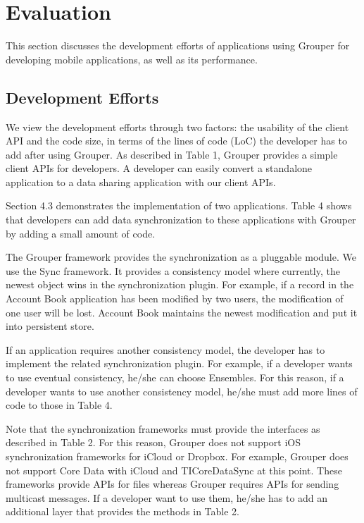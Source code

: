 \documentclass{sig-alternate-05-2015}
\begin{document}
\section{Evaluation}

This section discusses the development efforts of applications using Grouper for developing mobile applications, as well as its performance.

\subsection{Development Efforts}

We view the development efforts through two factors: the usability of the client API and the code size, in terms of the lines of code (LoC) the developer has to add after using Grouper. 
As described in Table 1, Grouper provides a simple client APIs for developers.
A developer can easily convert a standalone application to a data sharing application with our client APIs.

Section 4.3 demonstrates the implementation of two applications.
Table 4 shows that developers can add data synchronization to these applications with Grouper by adding a small amount of code. 

The Grouper framework provides the synchronization as a pluggable module.
We use the Sync\cite{sync} framework.
It provides a consistency model where currently, the newest object wins in the synchronization plugin.
For example, if a record in the Account Book application has been modified by two users, the modification of one user will be lost.
Account Book maintains the newest modification and put it into persistent store.

If an application requires another consistency model, the developer has to implement the related synchronization plugin.
For example, if a developer wants to use eventual consistency, he/she can choose Ensembles\cite{ensembles}.
For this reason, if a developer wants to use another consistency model, he/she must add more lines of code to those in Table 4.

Note that the synchronization frameworks must provide the interfaces as described in Table 2.
For this reason, Grouper does not support iOS synchronization frameworks for iCloud or Dropbox.
For example, Grouper does not support Core Data with iCloud\cite{coredata} and TICoreDataSync\cite{ticoredatasyn} at this point.
These frameworks provide APIs for files whereas Grouper requires APIs for sending multicast messages.
If a developer want to use them, he/she has to add an additional layer that provides the methods in Table 2.
\end{document}
